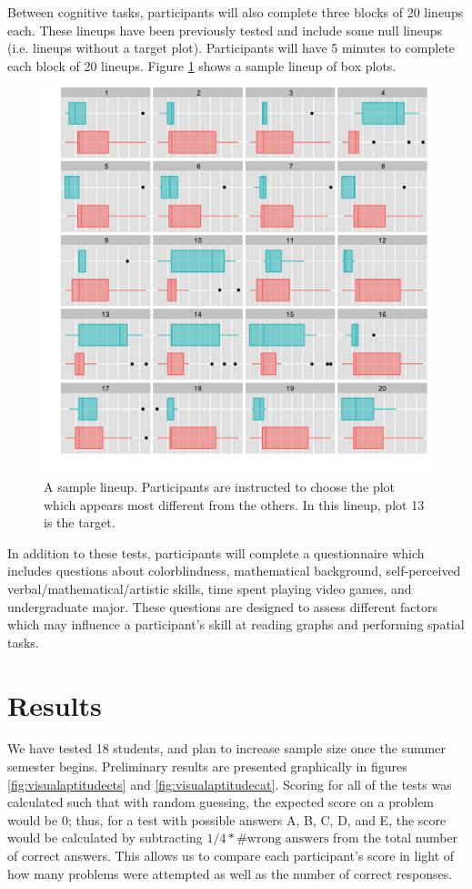 \documentclass[11pt]{isuthesis}\usepackage[]{graphicx}\usepackage[]{color}
\begin{document}
Between cognitive tasks, participants will also complete three blocks of 20 lineups each. These lineups have been previously tested \citep{hofmann2012graphical} and include some null lineups (i.e. lineups without a target plot). Participants will have 5 minutes to complete each block of 20 lineups. Figure \ref{fig:lineup} shows a sample lineup of box plots. 

\begin{figure}[htbp]\centering
\includegraphics[width=.9\textwidth]{lineup}
\caption[Sample Lineup]{A sample lineup. Participants are instructed to choose the plot which appears most different from the others. In this lineup, plot 13 is the target. }\label{fig:lineup}
\end{figure}

In addition to these tests, participants will complete a questionnaire which includes questions about colorblindness, mathematical background, self-perceived verbal/mathematical/artistic skills, time spent playing video games, and undergraduate major. These questions are designed to assess different factors which may influence a participant's skill at reading graphs and performing spatial tasks. 

\section{Results}
We have tested 18 students, and plan to increase sample size once the summer semester begins. Preliminary results are presented graphically in figures \ref{fig:visualaptitudects} and \ref{fig:visualaptitudecat}. Scoring for all of the tests was calculated such that with random guessing, the expected score on a problem would be 0; thus, for a test with possible answers A, B, C, D, and E, the score would be calculated by subtracting $1/4*\text{\# wrong answers}$ from the total number of correct answers. This allows us to compare each participant's score in light of how many problems were attempted as well as the number of correct responses.  
\end{document}
